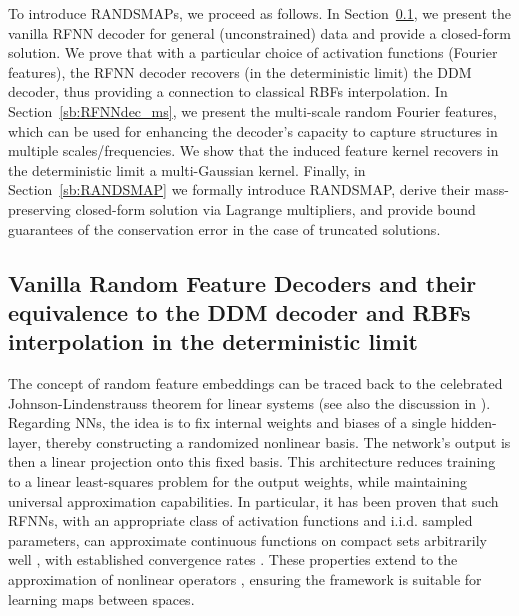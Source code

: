 \documentclass{article}
\begin{document}
To introduce RANDSMAPs, we proceed as follows. In Section~\ref{sb:RFNNdec}, we present the vanilla RFNN decoder for general (unconstrained) data and provide a closed-form solution. We prove that with a particular choice of activation functions (Fourier features), the RFNN decoder recovers (in the deterministic limit) the DDM decoder, thus providing a connection to classical RBFs interpolation. In Section~\ref{sb:RFNNdec_ms}, we present the multi-scale random Fourier features, which can be used for enhancing the decoder’s capacity to capture structures in multiple scales/frequencies. We show that the induced feature kernel recovers in the deterministic limit a multi-Gaussian kernel. Finally, in Section~\ref{sb:RANDSMAP} we formally introduce RANDSMAP, derive their mass-preserving closed-form solution via Lagrange multipliers, and provide bound guarantees of the conservation error in the case of truncated solutions. 

\subsection{Vanilla Random Feature Decoders and their equivalence to the DDM decoder and RBFs interpolation in the deterministic limit} \label{sb:RFNNdec}
The concept of random feature embeddings can be traced back to the celebrated Johnson-Lindenstrauss theorem \cite{johnson1984extensions} for linear systems (see also the discussion in \cite{galaris2022numerical,fabiani2023parsimonious}). Regarding NNs, the idea is to fix internal weights and biases of a single hidden-layer, thereby constructing a randomized nonlinear basis. The network's output is then a linear projection onto this fixed basis. This architecture reduces training to a linear least-squares problem for the output weights, while maintaining universal approximation capabilities. In particular, it has been proven that such RFNNs, with an appropriate class of activation functions and i.i.d. sampled parameters, can approximate continuous functions on compact sets arbitrarily well \cite{igelnik1995stochastic}, with established convergence rates \cite{makovoz1996random,rahimi2007random,rahimi2008uniform,gorban2016approximation}. These properties extend to the approximation of nonlinear operators \cite{fabiani2025randonets}, ensuring the framework is suitable for learning maps between spaces.

\end{document}
